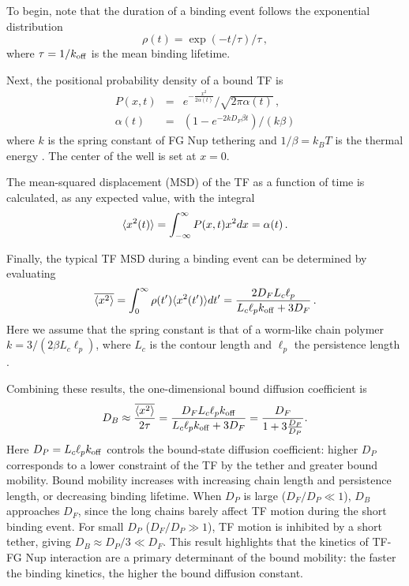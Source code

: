
To begin, note that the duration of a binding event follows the exponential distribution 
\begin{equation}
\rho (t) = \exp(-t/\tau)/\tau\,,
\end{equation}
where $\tau = 1/k_{\rm off}$ is the mean binding lifetime.

Next, the positional probability density of a bound TF is 
\begin{eqnarray}
P(x,t) &=& e^{-\frac{x^2}{2 \alpha(t)}}/\sqrt{2\pi \alpha(t)}\,,\\
\alpha(t) &=& (1-e^{-2kD_F\beta t})/(k\beta)
\end{eqnarray}
 where $k$ is the spring constant of FG Nup tethering and $1/\beta = k_BT$ is the thermal energy \cite{doi88}.  The center of the well is set at $x=0$.

The mean-squared displacement (MSD) of the TF as a function of time is calculated, as any expected value, with the integral
\begin{equation}
\langle x^2(t) \rangle = \int_{-\infty}^{\infty} P(x,t) x^2 dx = \alpha(t)\,.
\end{equation}

Finally, the typical TF MSD during a binding event can be determined by evaluating
\begin{equation}\label{eq:sho}
  \overline{\langle x^2 \rangle} = \int_0^{\infty} \rho(t') \langle x^2(t') \rangle dt' = \frac{2D_F L_c
    \ell_p}{L_c \ell_p k_{\rm off}+ 3D_F}\,. 
\end{equation} 
Here we assume that the spring constant is that of a worm-like chain polymer $k = 3/(2\beta L_c \ell_p)$, where $L_c$ is the contour length and $\ell_p$ the persistence length \cite{howard01}.


Combining these results, the one-dimensional bound diffusion coefficient is
\begin{equation}\label{eq:dbound}
  D_B \approx \frac{\overline{\langle x^2 \rangle}}{2\tau} = \frac{D_F L_c \ell_p
    k_{\mathrm{off}}}{L_c \ell_p k_{\mathrm{off}} + 3D_F} =
  \frac{D_F}{1+3\frac{D_F}{D_{P}}}.  
\end{equation}
Here $D_P = L_c \ell_p k_{\mathrm{off}}$ controls the bound-state diffusion coefficient: higher $D_P$ corresponds to a lower constraint of the TF by the tether and greater bound mobility. Bound mobility increases with increasing chain length and persistence length, or decreasing binding lifetime. When $D_P$ is large ($D_F/D_P\ll1$), $D_B$ approaches $D_F$, since the long chains barely affect TF motion during the short binding event. For small $D_P$ ($D_F/D_P\gg1$), TF motion is inhibited by a short tether, giving $D_B\approx D_P/3\ll D_F$.  This result highlights that the kinetics of TF-FG Nup interaction are a primary determinant of the bound mobility: the faster the binding kinetics, the higher the bound diffusion constant.


